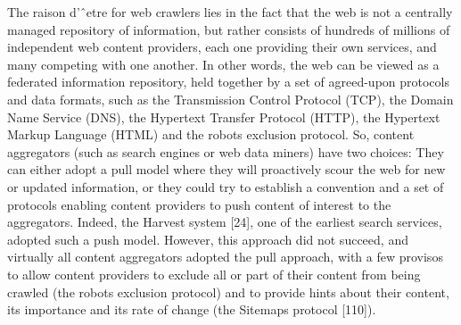 The raison d’ˆetre for web crawlers lies in the fact that the web is
not a centrally managed repository of information, but rather consists
of hundreds of millions of independent web content providers, each one
providing their own services, and many competing with one another.
In other words, the web can be viewed as a federated information repository,
held together by a set of agreed-upon protocols and data formats,
such as the Transmission Control Protocol (TCP), the Domain Name
Service (DNS), the Hypertext Transfer Protocol (HTTP), the Hypertext
Markup Language (HTML) and the robots exclusion protocol. So,
content aggregators (such as search engines or web data miners) have
two choices: They can either adopt a pull model where they will proactively
scour the web for new or updated information, or they could
try to establish a convention and a set of protocols enabling content
providers to push content of interest to the aggregators. Indeed, the
Harvest system [24], one of the earliest search services, adopted such
a push model. However, this approach did not succeed, and virtually
all content aggregators adopted the pull approach, with a few provisos
to allow content providers to exclude all or part of their content
from being crawled (the robots exclusion protocol) and to provide hints
about their content, its importance and its rate of change (the Sitemaps
protocol [110]).
\clearpage